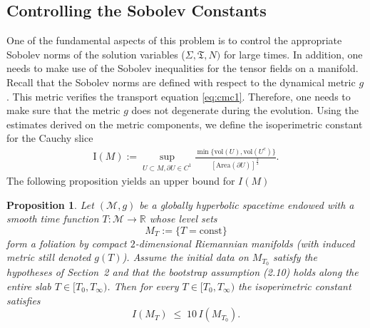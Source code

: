 \documentclass{amsart}
\newtheorem{proposition}{Proposition}[section]
\begin{document}
\subsection{Controlling the Sobolev Constants}
\label{sobolev2}
\noindent One of the fundamental aspects of this problem is to control the appropriate Sobolev norms of the solution variables ($\Sigma,\mathfrak{T},N)$ for large times. In addition, one needs to make use of the Sobolev inequalities for the tensor fields on a manifold. Recall that the Sobolev norms are defined with respect to the dynamical metric $g$. This metric verifies the transport equation \ref{eq:cmc1}. Therefore, one needs to make sure that the metric $g$ does not degenerate during the evolution. Using the estimates derived on the metric components, we define the isoperimetric constant for the Cauchy slice
\begin{align}
 \text{I}(M):=\sup_{U\subset M,\partial U\in C^{1}}\frac{\min\{\text{vol}(U),\text{vol}(U^{c})\}}{[\text{Area}(\partial U)]^{\frac{3}{2}}}.   
\end{align}
The following proposition yields an upper bound for $I(M)$ 
\begin{proposition}\label{prop:isoperimetric-control}
Let $(\mathcal{M},g)$ be a globally hyperbolic spacetime endowed with a
smooth time function $T\colon \mathcal{M}\to\mathbb{R}$ whose level sets 
\[
M_{T}:=\{T=\mathrm{const}\}
\]
form a foliation by compact $2$-dimensional Riemannian manifolds 
(with induced metric still denoted $g(T)$).  
Assume the initial data on $M_{T_{0}}$ satisfy the hypotheses of Section~2
and that the bootstrap assumption \emph{(2.10)} holds along the entire slab 
$T\in[T_{0},T_{\infty})$.
Then for every $T\in [T_{0},T_{\infty})$ the isoperimetric constant satisfies
\begin{equation}\label{eq:iso-bound}
     I(M_{T}) \;\leq\; 10\,I(M_{T_{0}}).
\end{equation}
\end{proposition}
\end{document}
